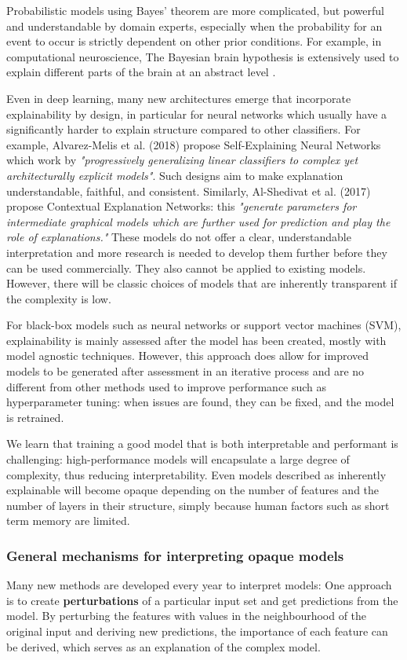 \documentclass[proposal]{softeng}
\begin{document}
Probabilistic models using Bayes' theorem are more complicated, but powerful and understandable by domain experts, especially when the probability for an event to occur is strictly dependent on other prior conditions. For example, in computational neuroscience, The Bayesian brain hypothesis is extensively used to explain different parts of the brain at an abstract level \cite{YairWeiss2002Miao}.

Even in deep learning, many new architectures emerge that incorporate explainability by design, in particular for neural networks which usually have a significantly harder to explain structure compared to other classifiers. For example, Alvarez-Melis et al. (2018)\cite{alvarezmelis2018robust} propose Self-Explaining Neural Networks which work by \textit{"progressively generalizing linear classifiers to complex yet architecturally explicit models"}. Such designs aim to make explanation understandable, faithful, and consistent. Similarly, Al-Shedivat et al. (2017)\cite{alshedivat2017contextual} propose Contextual Explanation Networks: this \textit {"generate parameters for intermediate graphical models which are further used for prediction and play the role of explanations."} These models do not offer a clear, understandable interpretation and more research is needed to develop them further before they can be used commercially. They also cannot be applied to existing models. However, there will be classic choices of models that are inherently transparent if the complexity is low.

For black-box models such as neural networks or support vector machines (SVM), explainability is mainly assessed after the model has been created, mostly with model agnostic techniques. However, this approach does allow for improved models to be generated after assessment in an iterative process and are no different from other methods used to improve performance such as hyperparameter tuning: when issues are found, they can be fixed, and the model is retrained.

We learn that training a good model that is both interpretable and performant is challenging: high-performance models will encapsulate a large degree of complexity, thus reducing interpretability. Even models described as inherently explainable will become opaque depending on the number of features and the number of layers in their structure, simply because human factors such as short term memory are limited.

\subsubsection{General mechanisms for interpreting opaque models}
Many new methods are developed every year to interpret models:
One approach is to create \textbf{perturbations} of a particular input set and get predictions from the model. By perturbing the features with values in the neighbourhood of the original input and deriving new predictions, the importance of each feature can be derived, which serves as an explanation of the complex model.
\end{document}
